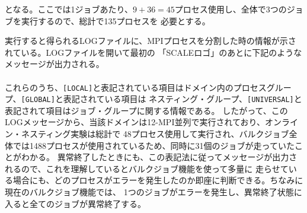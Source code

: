 となる。ここでは1ジョブあたり、$9 + 36 = 45$プロセス使用し、全体で3つのジョブを実行するので、総計で135プロセスを
必要とする。

実行すると得られるLOGファイルに、MPIプロセスを分割した時の情報が示されている。LOGファイルを開いて最初の
「SCALEロゴ」のあとに下記のようなメッセージが出力される。\\

\\

これらのうち、\verb|[LOCAL]|と表記されている項目はドメイン内のプロセスグループ、\verb|[GLOBAL]|と表記されている項目は
ネスティング・グループ、\verb|[UNIVERSAL]|と表記されて項目はジョブ・グループに関する情報である。
したがって、このLOGメッセージから、当該ドメインは12-MPI並列で実行されており、オンライン・ネスティング実験は総計で
48プロセス使用して実行され、バルクジョブ全体では1488プロセスが使用されているため、同時に31個のジョブが走っていたことがわかる。
異常終了したときにも、この表記法に従ってメッセージが出力されるので、これを理解しているとバルクジョブ機能を使って多量に
走らせている場合にも、どのプロセスがエラーを発生したのか即座に判断できる。ちなみに現在のバルクジョブ機能では、
1つのジョブがエラーを発生し、異常終了状態に入ると全てのジョブが異常終了する。




